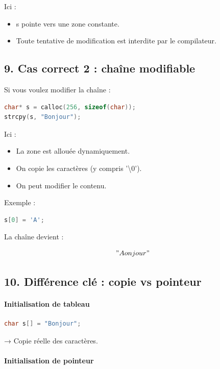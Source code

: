 Ici :

\begin{itemize}
\item s pointe vers une zone constante.
\item Toute tentative de modification est interdite par le compilateur.
\end{itemize}

\subsection{9. Cas correct 2 : chaîne modifiable}

Si vous voulez modifier la chaîne :

\begin{lstlisting}[language=C]
char* s = calloc(256, sizeof(char));
strcpy(s, "Bonjour");
\end{lstlisting}

Ici :

\begin{itemize}
\item La zone est allouée dynamiquement.
\item On copie les caractères (y compris '\textbackslash 0').
\item On peut modifier le contenu.
\end{itemize}

Exemple :

\begin{lstlisting}[language=C]
s[0] = 'A';
\end{lstlisting}

La chaîne devient :

\[
"Aonjour"
\]

\subsection{10. Différence clé : copie vs pointeur}

\paragraph{Initialisation de tableau}

\begin{lstlisting}[language=C]
char s[] = "Bonjour";
\end{lstlisting}

→ Copie réelle des caractères.

\paragraph{Initialisation de pointeur}

